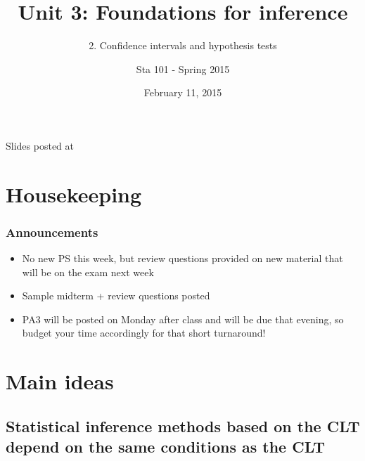 \documentclass[slidestop,compress,mathserif,12pt,t,professionalfonts,xcolor=table]{beamer}
\title{Unit 3: Foundations for inference}
\subtitle{2. Confidence intervals and hypothesis tests}
\author{Sta 101 - Spring 2015}
\date{February 11, 2015}
\institute{Duke University, Department of Statistical Science}
\begin{document}


\begin{frame}[plain]

\titlepage
\vfill
{\scriptsize {} \hfill Slides posted at  \webLink{\CourseSite}{\CourseSite}}
\addtocounter{framenumber}{-1} 

\end{frame}


\section{Housekeeping}


\begin{frame}
\frametitle{Announcements}

\begin{itemize}

\item No new PS this week, but review questions provided on new material that will be on the exam next week

\item Sample midterm + review questions posted

\item PA3 will be posted on Monday after class and will be due that evening, so budget your time accordingly for that short turnaround!

\end{itemize}

\end{frame}


\section{Main ideas}


\subsection{Statistical inference methods based on the CLT depend on the same conditions as the CLT}
\label{mi1}

\end{document}
